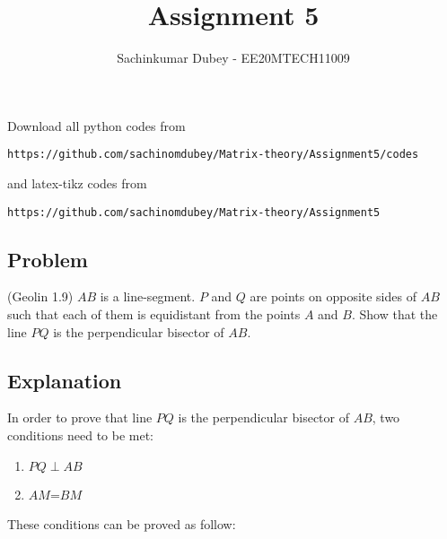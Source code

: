 \documentclass[journal,12pt,twocolumn]{IEEEtran}
\begin{document}
\def\putbox#1#2#3{\makebox[0in][l]{\makebox[#1][l]{}\raisebox{\baselineskip}[0in][0in]{\raisebox{#2}[0in][0in]{#3}}}}
     \def\rightbox#1{\makebox[0in][r]{#1}}
     \def\centbox#1{\makebox[0in]{#1}}
     \def\topbox#1{\raisebox{-\baselineskip}[0in][0in]{#1}}
     \def\midbox#1{\raisebox{-0.5\baselineskip}[0in][0in]{#1}}
\vspace{3cm}
\title{Assignment 5}
\author{Sachinkumar Dubey - EE20MTECH11009}
\maketitle
\newpage
\bigskip
\renewcommand{\thefigure}{\theenumi}
\renewcommand{\thetable}{\theenumi}
Download all python codes from 
\begin{lstlisting}
https://github.com/sachinomdubey/Matrix-theory/Assignment5/codes
\end{lstlisting}
%
and latex-tikz codes from 
%
\begin{lstlisting}
https://github.com/sachinomdubey/Matrix-theory/Assignment5
\end{lstlisting}
\subsection{Problem}
(Geolin 1.9) $AB$ is a line-segment. $P$ and $Q$ are points on opposite sides of $AB$ such that each of them is equidistant from the points $A$ and $B$. Show that the line $PQ $ is the perpendicular bisector of $AB$.\\
\begin{figure}[h!]
\centering
\resizebox{\columnwidth}{!}
    {
    
    }
\end{figure}
\subsection{Explanation}
In order to prove that line $PQ $ is the perpendicular bisector of $AB$, two conditions need to be met:
\begin{enumerate}
        \item $PQ \perp AB $
    \item $AM$=$BM$
\end{enumerate}
These conditions can be proved as follow:
\end{document}
